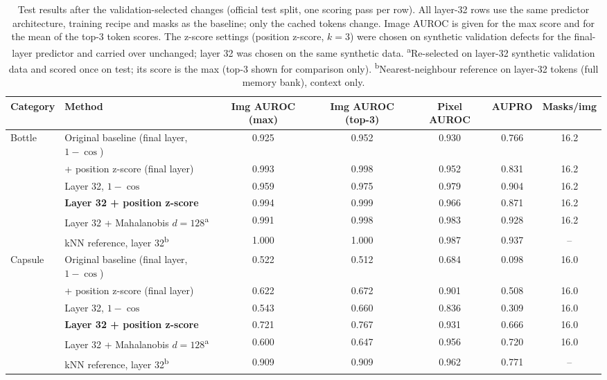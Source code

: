 \begin{table}[t]
\caption{Test results after the validation-selected changes (official test split, one scoring pass per row). All layer-32 rows use the same predictor architecture, training recipe and masks as the baseline; only the cached tokens change. Image AUROC is given for the max score and for the mean of the top-3 token scores. The z-score settings (position z-score, $k{=}3$) were chosen on synthetic validation defects for the final-layer predictor and carried over unchanged; layer 32 was chosen on the same synthetic data. \textsuperscript{a}Re-selected on layer-32 synthetic validation data and scored once on test; its score is the max (top-3 shown for comparison only). \textsuperscript{b}Nearest-neighbour reference on layer-32 tokens (full memory bank), context only.}
\label{tab:improved}
\centering
\footnotesize
\begin{tabular}{llccccc}
\hline
\textbf{Category} & \textbf{Method} & \textbf{Img AUROC (max)} & \textbf{Img AUROC (top-3)} & \textbf{Pixel AUROC} & \textbf{AUPRO} & \textbf{Masks/img} \\
\hline
\multirow{6}{*}{Bottle}
 & Original baseline (final layer, $1-\cos$) & 0.925 & 0.952 & 0.930 & 0.766 & 16.2 \\
 & + position z-score (final layer) & 0.993 & 0.998 & 0.952 & 0.831 & 16.2 \\
 & Layer 32, $1-\cos$ & 0.959 & 0.975 & 0.979 & 0.904 & 16.2 \\
 & \textbf{Layer 32 + position z-score} & 0.994 & 0.999 & 0.966 & 0.871 & 16.2 \\
 & Layer 32 + Mahalanobis $d{=}128$\textsuperscript{a} & 0.991 & 0.998 & 0.983 & 0.928 & 16.2 \\
 & kNN reference, layer 32\textsuperscript{b} & 1.000 & 1.000 & 0.987 & 0.937 & -- \\
\hline
\multirow{6}{*}{Capsule}
 & Original baseline (final layer, $1-\cos$) & 0.522 & 0.512 & 0.684 & 0.098 & 16.0 \\
 & + position z-score (final layer) & 0.622 & 0.672 & 0.901 & 0.508 & 16.0 \\
 & Layer 32, $1-\cos$ & 0.543 & 0.660 & 0.836 & 0.309 & 16.0 \\
 & \textbf{Layer 32 + position z-score} & 0.721 & 0.767 & 0.931 & 0.666 & 16.0 \\
 & Layer 32 + Mahalanobis $d{=}128$\textsuperscript{a} & 0.600 & 0.647 & 0.956 & 0.720 & 16.0 \\
 & kNN reference, layer 32\textsuperscript{b} & 0.909 & 0.909 & 0.962 & 0.771 & -- \\

\end{tabular}
\end{table}
